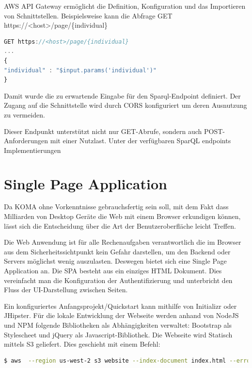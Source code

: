 \documentclass[
12pt,
english,
ngerman,
headsepline,
twoside,
openright,
numbers=noenddot,version=first
]{scrreprt}
\begin{document}
AWS API Gateway ermöglicht die Definition, Konfiguration und das Importieren von Schnittstellen. Beispielsweise kann die Abfrage GET https://<host>/page/\{individual\} 

\begin{lstlisting}[language=Javascript,caption={API Gateway Request Mapping Template},label={lst:map-template}]
GET https://<host>/page/{individual} 
...
{
"individual" : "$input.params('individual')"
}
\end{lstlisting}

Damit wurde die zu erwartende Eingabe für den Sparql-Endpoint definiert. Der Zugang auf die Schnittstelle wird durch CORS konfiguriert um deren Ausnutzung zu vermeiden. 

Dieser Endpunkt unterstützt nicht nur GET-Abrufe, sondern auch POST-Anforderungen mit einer Nutzlast.
Unter der verfügbaren SparQL endpoints Implementierungen



\section{Single Page Application}
\label{sec:spa}

Da KOMA ohne Vorkenntnisse gebrauchsfertig sein soll, mit dem Fakt dass Milliarden von Desktop Geräte die Web mit einem Browser erkundigen können, lässt sich die Entscheidung über die Art der Benutzeroberfläche leicht Treffen.

Die Web Anwendung ist für alle Rechenaufgaben verantwortlich die im Browser aus dem Sicherheitssichtpunkt kein Gefahr darstellen, um den Backend oder Servers möglichst wenig auszulasten. Deswegen bietet sich eine Single Page Application an. 
Die SPA besteht aus ein einziges HTML Dokument. Dies vereinfacht man die Konfiguration der Authentifizierung und unterbricht den Fluss der UI-Darstellung zwischen Seiten.

Ein konfiguriertes Anfangsprojekt/Quickstart kann mithilfe von Initializr\cite{Initializr} oder JHipster\cite{Jhipster}. Für die lokale Entwicklung der Webseite werden anhand von NodeJS und NPM folgende Bibliotheken als Abhängigkeiten verwaltet: Bootstrap als Stylescheet und jQuery als Javascript-Bibliothek.
Die Webseite wird Statisch mittels S3 geliefert. Dies geschieht mit einem Befehl: 
\begin{lstlisting}[language=BASH, caption={Webseite veröffentlichen}]
$ aws  --region us-west-2 s3 website --index-document index.html --error-document error.html 's3://koma.thb.de'
\end{lstlisting} 
\end{document}
